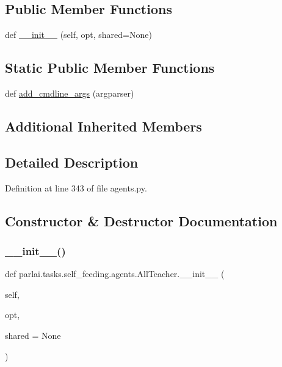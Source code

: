 \subsection*{Public Member Functions}
\begin{DoxyCompactItemize}
\item 
def \hyperlink{classparlai_1_1tasks_1_1self__feeding_1_1agents_1_1AllTeacher_a2657afc24f3e110cdd61a361462feb27}{\+\_\+\+\_\+init\+\_\+\+\_\+} (self, opt, shared=None)
\end{DoxyCompactItemize}
\subsection*{Static Public Member Functions}
\begin{DoxyCompactItemize}
\item 
def \hyperlink{classparlai_1_1tasks_1_1self__feeding_1_1agents_1_1AllTeacher_aaf96c800f6f56fac5b3c014bb193caa7}{add\+\_\+cmdline\+\_\+args} (argparser)
\end{DoxyCompactItemize}
\subsection*{Additional Inherited Members}


\subsection{Detailed Description}


Definition at line 343 of file agents.\+py.



\subsection{Constructor \& Destructor Documentation}
\mbox{\label{classparlai_1_1tasks_1_1self__feeding_1_1agents_1_1AllTeacher_a2657afc24f3e110cdd61a361462feb27}} 
\subsubsection{\texorpdfstring{\+\_\+\+\_\+init\+\_\+\+\_\+()}{\_\_init\_\_()}}
{\footnotesize\ttfamily def parlai.\+tasks.\+self\+\_\+feeding.\+agents.\+All\+Teacher.\+\_\+\+\_\+init\+\_\+\+\_\+ (\begin{DoxyParamCaption}\item[{}]{self,  }\item[{}]{opt,  }\item[{}]{shared = {\ttfamily None} }\end{DoxyParamCaption})}



